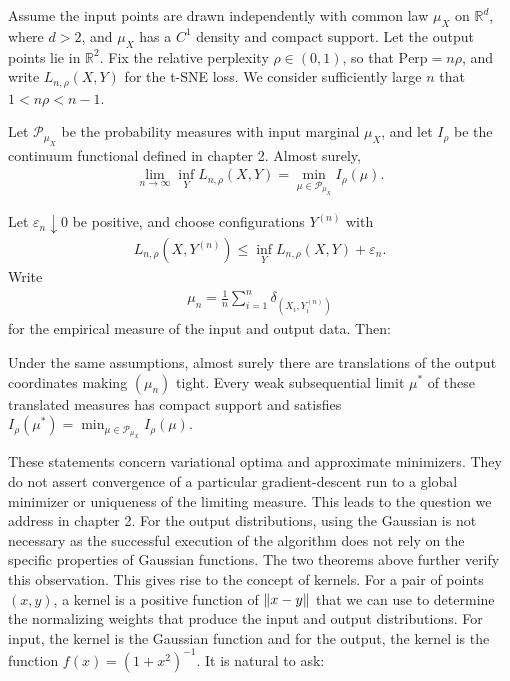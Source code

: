 \begin{theorem} \label{thm:auffinger-tsne_1.1}
    Assume the input points are drawn independently with common law $\mu_X$ on $\mathbb{R}^d$, where $d>2$, and $\mu_X$ has a $C^1$ density and compact support. Let the output points lie in $\mathbb{R}^2$. Fix the relative perplexity $\rho\in(0,1)$, so that $\mathrm{Perp}=n\rho$, and write $L_{n,\rho}(X,Y)$ for the t-SNE loss. We consider sufficiently large $n$ that $1<n\rho<n-1$.

    Let $\mathcal{P}_{\mu_X}$ be the probability measures with input marginal $\mu_X$, and let $I_\rho$ be the continuum functional defined in chapter 2. Almost surely,
    \begin{align}
        \lim_{n \to \infty} \inf_{Y} L_{n,\rho}(X,Y) = \min_{\mu \in \mathcal{P}_{\mu_X}} I_{\rho}(\mu).
    \end{align}
\end{theorem}
Let $\varepsilon_n\downarrow0$ be positive, and choose configurations $Y^{(n)}$ with
\begin{align*}
    L_{n,\rho}(X,Y^{(n)})\leq\inf_Y L_{n,\rho}(X,Y)+\varepsilon_n.
\end{align*}
Write
\begin{align}
    \mu_n = \frac{1}{n}\sum_{i=1}^n \delta_{(X_i,Y_i^{(n)})}
\end{align}
for the empirical measure of the input and output data. Then:
\begin{theorem} \label{thm:auffinger-tsne_1.2}
    Under the same assumptions, almost surely there are translations of the output coordinates making $(\mu_n)$ tight. Every weak subsequential limit $\mu^*$ of these translated measures has compact support and satisfies $I_{\rho}(\mu^*) = \min_{\mu \in \mathcal{P}_{\mu_X}} I_{\rho}(\mu)$.
\end{theorem}
These statements concern variational optima and approximate minimizers. They
do not assert convergence of a particular gradient-descent run to a global
minimizer or uniqueness of the limiting measure. This leads to the question
we address in chapter 2.
For the output distributions, using the Gaussian is not necessary as the
successful execution of the algorithm does not rely on the specific properties
of Gaussian functions. The two theorems above further verify this observation.
This gives rise to the concept of kernels. For a pair of points $(x,y)$, a
kernel is a positive function of $\left\lVert x-y\right\rVert$ that we can use to determine the
normalizing weights that produce the input and output distributions. For input,
the kernel is the Gaussian function and for the output, the kernel is the
function $f(x) = (1 + x^2)^{-1}$. It is natural to ask:

